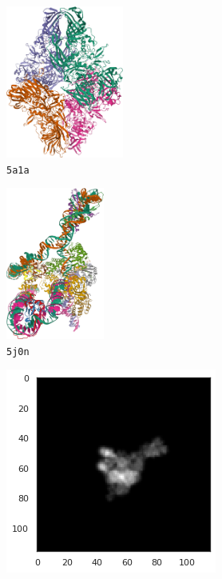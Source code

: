 \begin{figure}[ht!]
    \centering
    \begin{minipage}[b]{0.55\linewidth}
        \centering
        \begin{subfigure}[b]{0.49\linewidth}
            \centering
            \includegraphics[height=5cm]{figures/5a1a_pdb.png}
            \caption*{\texttt{5a1a}}
        \end{subfigure}
        \hfill
        \begin{subfigure}[b]{0.42\linewidth}
            \centering
            \includegraphics[height=5cm]{figures/5j0n_pdb.png}
            \caption*{\texttt{5j0n}}
        \end{subfigure}
        \caption{%
            Ground-truth proteins: the $\beta$-galactosidase (\texttt{5a1a})~\cite{5a1a_pdb}, and the lambda excision HJ intermediate (\texttt{5j0n})~\cite{5j0n_pdb}.
        }\label{fig:pdb-proteins}
    \end{minipage}
    \hfill
    \begin{minipage}[b]{0.35\linewidth}
        \centering
        \begin{subfigure}[b]{0.49\textwidth}
            \centering
            \includegraphics[width=0.8\linewidth]{figures/5j0n_noise0}

\end{subfigure}
\end{minipage}
\end{figure}
